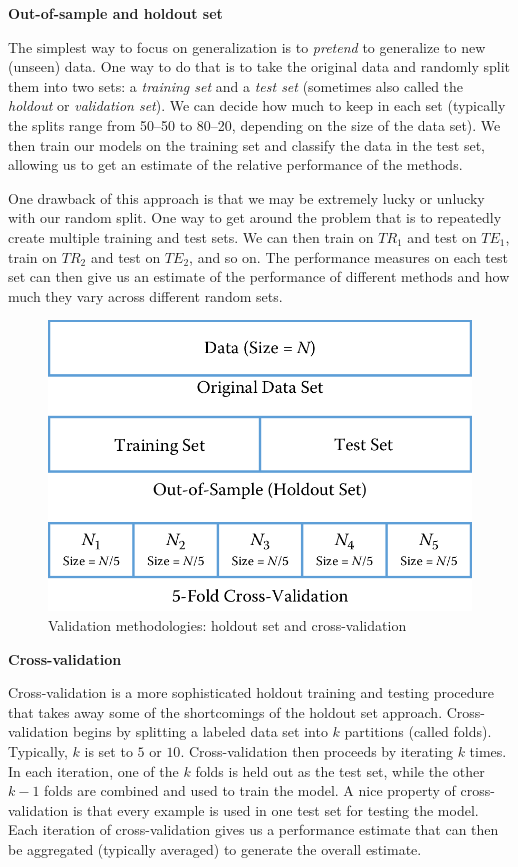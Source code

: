 \documentclass[]{krantz}
\begin{document}
\textbf{Out-of-sample and holdout set}

The simplest way to focus on generalization is to \emph{pretend} to
generalize to new (unseen) data. One way to do that is to take the
original data and randomly split them into two sets: a \emph{training
set} and a \emph{test set} (sometimes also called the \emph{holdout} or
\emph{validation set}). We can decide how much to keep in each set
(typically the splits range from 50--50 to 80--20, depending on the size
of the data set). We then train our models on the training set and
classify the data in the test set, allowing us to get an estimate of the
relative performance of the methods.

One drawback of this approach is that we may be extremely lucky or
unlucky with our random split. One way to get around the problem that is
to repeatedly create multiple training and test sets. We can then train
on \(TR_1\) and test on \(TE_1\), train on \(TR_2\) and test on
\(TE_2\), and so on. The performance measures on each test set can then
give us an estimate of the performance of different methods and how much
they vary across different random sets.

\begin{figure}

{\centering \includegraphics[width=0.7\linewidth]{ChapterML/figures/holdout} 

}

\caption{Validation methodologies: holdout set and cross-validation}\label{fig:holdout}
\end{figure}

\textbf{Cross-validation}

Cross-validation is a more sophisticated holdout training and testing
procedure that takes away some of the shortcomings of the holdout set
approach. Cross-validation begins by splitting a labeled data set into
\(k\) partitions (called folds). Typically, \(k\) is set to \(5\) or
\(10\). Cross-validation then proceeds by iterating \(k\) times. In each
iteration, one of the \(k\) folds is held out as the test set, while the
other \(k-1\) folds are combined and used to train the model. A nice
property of cross-validation is that every example is used in one test
set for testing the model. Each iteration of cross-validation gives us a
performance estimate that can then be aggregated (typically averaged) to
generate the overall estimate.
\end{document}
